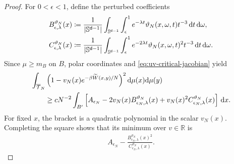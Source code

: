 \documentclass[11pt,reqno]{amsart}
\numberwithin{equation}{section}
\theoremstyle{plain}
\theoremstyle{remark}
\DeclarePairedDelimiter{\abs}{\lvert}{\rvert}
\renewcommand{\d}{\mathsf{d}}
\newcommand{\md}{\mathrm{d}}
\newcommand{\R}{{\mathbb{R}}}
\newcommand{\tl}{\widetilde}
\newcommand{\be}{\beta}
\begin{document}
\begin{proof}
For \(0<\epsilon<1\), define the perturbed coefficients
\begin{align}
 B_{\epsilon,\lambda}^{\vartheta_N}(x)
 &\coloneqq\frac1{\abs{\mathbb S^{\d-1}}}
 \int_{\mathbb S^{\d-1}}\int_\epsilon^1
 e^{-\lambda t}\vartheta_N(x,\omega,t)t^{-3}\,\md t\,\md\omega,
 \label{eq:uv-critical-B-vartheta-def}\\
 C_{\epsilon,\lambda}^{\vartheta_N}(x)
 &\coloneqq\frac1{\abs{\mathbb S^{\d-1}}}
 \int_{\mathbb S^{\d-1}}\int_\epsilon^1
 e^{-2\lambda t}\vartheta_N(x,\omega,t)^2t^{-3}\,\md t\,\md\omega.
 \label{eq:uv-critical-C-vartheta-def}
\end{align}
Since \(\mu\ge m_B\) on \(B\), polar coordinates and \eqref{eq:uv-critical-jacobian} yield
\begin{align}\label{eq:uv-critical-quadratic-reduction}
 &\int_{\overline{\mathcal T}_N}
 \left(1-v_N(x)e^{-\be\tl W(x,y)/N}\right)^2
 \md\mu(x)\md\mu(y)\notag\\
 &\qquad\ge cN^{-2}
 \int_{B'}
 \left[
 A_{\epsilon_N}
 -2v_N(x)B_{\epsilon_N,\lambda}^{\vartheta_N}(x)
 +v_N(x)^2C_{\epsilon_N,\lambda}^{\vartheta_N}(x)
 \right]\,\md x.
\end{align}
For fixed \(x\), the bracket is a quadratic polynomial in the scalar \(v_N(x)\).  Completing the square shows that its minimum over \(v\in\R\) is
\begin{align}\label{eq:uv-critical-quadratic-minimum}
 A_{\epsilon_N}
 -\frac{B_{\epsilon_N,\lambda}^{\vartheta_N}(x)^2}
 {C_{\epsilon_N,\lambda}^{\vartheta_N}(x)}.
\end{align}


\end{proof}
\end{document}

